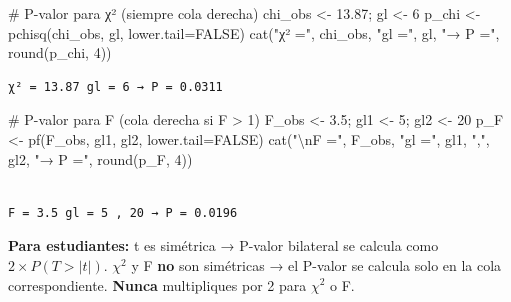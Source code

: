 \documentclass[
  letterpaper,
  DIV=11,
  numbers=noendperiod]{scrartcl}
\newenvironment{Shaded}{\begin{snugshade}}{\end{snugshade}}
\newcommand{\AttributeTok}[1]{\textcolor[rgb]{0.40,0.45,0.13}{#1}}
\newcommand{\CommentTok}[1]{\textcolor[rgb]{0.37,0.37,0.37}{#1}}
\newcommand{\ConstantTok}[1]{\textcolor[rgb]{0.56,0.35,0.01}{#1}}
\newcommand{\DecValTok}[1]{\textcolor[rgb]{0.68,0.00,0.00}{#1}}
\newcommand{\FloatTok}[1]{\textcolor[rgb]{0.68,0.00,0.00}{#1}}
\newcommand{\FunctionTok}[1]{\textcolor[rgb]{0.28,0.35,0.67}{#1}}
\newcommand{\NormalTok}[1]{\textcolor[rgb]{0.00,0.23,0.31}{#1}}
\newcommand{\OtherTok}[1]{\textcolor[rgb]{0.00,0.23,0.31}{#1}}
\newcommand{\SpecialCharTok}[1]{\textcolor[rgb]{0.37,0.37,0.37}{#1}}
\newcommand{\StringTok}[1]{\textcolor[rgb]{0.13,0.47,0.30}{#1}}
\begin{document}
\begin{Shaded}
\begin{Highlighting}[]
\CommentTok{\# P{-}valor para χ² (siempre cola derecha)}
\NormalTok{chi\_obs }\OtherTok{\textless{}{-}} \FloatTok{13.87}\NormalTok{; gl }\OtherTok{\textless{}{-}} \DecValTok{6}
\NormalTok{p\_chi }\OtherTok{\textless{}{-}} \FunctionTok{pchisq}\NormalTok{(chi\_obs, gl, }\AttributeTok{lower.tail=}\ConstantTok{FALSE}\NormalTok{)}
\FunctionTok{cat}\NormalTok{(}\StringTok{"χ² ="}\NormalTok{, chi\_obs, }\StringTok{"gl ="}\NormalTok{, gl, }\StringTok{"→ P ="}\NormalTok{, }\FunctionTok{round}\NormalTok{(p\_chi, }\DecValTok{4}\NormalTok{))}
\end{Highlighting}
\end{Shaded}

\begin{verbatim}
χ² = 13.87 gl = 6 → P = 0.0311
\end{verbatim}

\begin{Shaded}
\begin{Highlighting}[]
\CommentTok{\# P{-}valor para F (cola derecha si F \textgreater{} 1)}
\NormalTok{F\_obs }\OtherTok{\textless{}{-}} \FloatTok{3.5}\NormalTok{; gl1 }\OtherTok{\textless{}{-}} \DecValTok{5}\NormalTok{; gl2 }\OtherTok{\textless{}{-}} \DecValTok{20}
\NormalTok{p\_F }\OtherTok{\textless{}{-}} \FunctionTok{pf}\NormalTok{(F\_obs, gl1, gl2, }\AttributeTok{lower.tail=}\ConstantTok{FALSE}\NormalTok{)}
\FunctionTok{cat}\NormalTok{(}\StringTok{"}\SpecialCharTok{\textbackslash{}n}\StringTok{F ="}\NormalTok{, F\_obs, }\StringTok{"gl ="}\NormalTok{, gl1, }\StringTok{","}\NormalTok{, gl2, }\StringTok{"→ P ="}\NormalTok{, }\FunctionTok{round}\NormalTok{(p\_F, }\DecValTok{4}\NormalTok{))}
\end{Highlighting}
\end{Shaded}

\begin{verbatim}

F = 3.5 gl = 5 , 20 → P = 0.0196
\end{verbatim}

\begin{tcolorbox}[enhanced jigsaw, arc=.35mm, bottomrule=.15mm, bottomtitle=1mm, breakable, colback=white, colbacktitle=quarto-callout-warning-color!10!white, colframe=quarto-callout-warning-color-frame, coltitle=black, left=2mm, leftrule=.75mm, opacityback=0, opacitybacktitle=0.6, rightrule=.15mm, title=\textcolor{quarto-callout-warning-color}{\faExclamationTriangle}\hspace{0.5em}{Warning}, titlerule=0mm, toprule=.15mm, toptitle=1mm]

\textbf{Para estudiantes:} t es simétrica → P-valor bilateral se calcula
como \(2 \times P(T > |t|)\). \(\chi^2\) y F \textbf{no} son simétricas
→ el P-valor se calcula solo en la cola correspondiente. \textbf{Nunca}
multipliques por 2 para \(\chi^2\) o F.

\end{tcolorbox}
\end{document}
